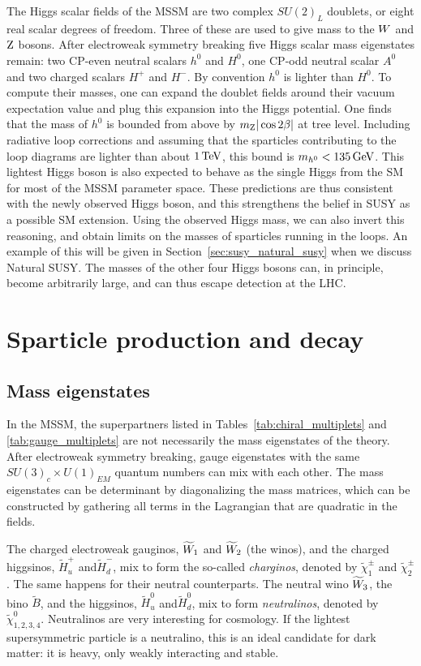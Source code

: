 The Higgs scalar fields of the MSSM are two complex $SU(2)_L$ doublets, or eight real scalar degrees
of freedom. 
Three of these are used to give mass to the $W$ and $\mathrm{Z}$ bosons. 
After electroweak symmetry breaking five Higgs scalar mass eigenstates remain: two CP-even neutral
scalars $h^0$ and $H^0$, one CP-odd neutral scalar $A^0$ and two charged scalars $H^+$ and $H^-$. By
convention $h^0$ is lighter than $H^0$. 
To compute their masses, one can expand the doublet fields around their vacuum expectation value and
plug this expansion into the Higgs potential. One finds that the mass of $h^0$ is bounded from
above by $m_{\mathrm{Z}} |\cos 2\beta|$ at tree level. Including radiative loop corrections and assuming
that the sparticles contributing to the loop diagrams are lighter than about $1\,\text{Te\hspace{-.08em}V}$, this bound is
$m_{h^0} < 135\,\text{Ge\hspace{-.08em}V}$. 
This lightest Higgs boson is also expected to behave as the single Higgs from the SM for most of
the MSSM parameter space. 
These predictions are thus consistent with the newly observed Higgs boson, and this strengthens the
belief in SUSY as a possible SM extension. Using the observed Higgs mass,
we can also invert this reasoning, and obtain limits on the masses of sparticles running in the
loops. An example of this will be given in Section~\ref{sec:susy_natural_susy} when we discuss
Natural SUSY. 
The masses of the other four Higgs bosons can, in principle, become arbitrarily large, and can
thus escape detection at the LHC. 


\section{Sparticle production and decay \label{sec:susy_sparticles}}

\subsection{Mass eigenstates}

In the MSSM, the superpartners listed in Tables~\ref{tab:chiral_multiplets} and
\ref{tab:gauge_multiplets} are not necessarily the mass eigenstates of the theory. After
electroweak symmetry breaking, gauge eigenstates with the same $SU(3)_c \times U(1)_{EM}$ quantum
numbers can mix with each other. 
The mass eigenstates can be determinant by diagonalizing the mass matrices, which can be
constructed by gathering all terms in the Lagrangian that are quadratic in the fields. 

The charged electroweak gauginos, $\widetilde{W}_1$ and $\widetilde{W}_2$ (the winos), and the
charged higgsinos, $\widetilde{H}_u^+$ and$\widetilde{H}_d^-$, mix to form the so-called
\textit{charginos}, denoted by $\widetilde{\chi}_1^\pm$ and $\widetilde{\chi}_2^\pm$. 
The same happens for their neutral counterparts. The neutral wino $\widetilde{W}_3$, the bino
$\widetilde{B}$, and the higgsinos, $\widetilde{H}_u^0$ and$\widetilde{H}_d^0$,  mix to form
\textit{neutralinos}, denoted by $\widetilde{\chi}_{1,2,3,4}^0$. 
Neutralinos are very interesting for cosmology. If the lightest supersymmetric particle is a
neutralino, this is an ideal candidate for dark matter: it is heavy, only weakly interacting and
stable. 

